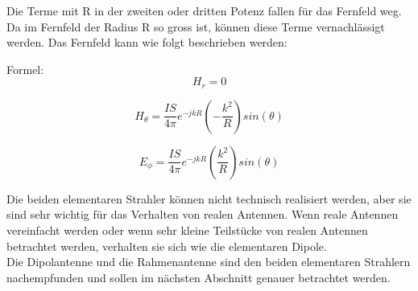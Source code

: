 Die Terme mit R in der zweiten oder dritten Potenz fallen für das Fernfeld weg. Da im Fernfeld der Radius R so gross ist, können diese  Terme vernachlässigt werden. 
Das Fernfeld kann wie folgt beschrieben werden:


Formel:
\begin{equation}
H_r= 0
\end{equation}

\begin{equation}
H_\theta= \frac{I S}{4\pi}   e^{-jkR} \left(- \frac{k^{2}}{R}   \right) sin(\theta)
\end{equation}

\begin{equation}
E_\phi= \frac{I S}{4\pi}   e^{-jkR} \left( \frac{k^{2}}{R}   \right) sin(\theta)
\end{equation}

Die beiden elementaren Strahler können nicht technisch  realisiert werden, aber sie sind sehr wichtig für das Verhalten von realen Antennen. Wenn reale Antennen vereinfacht werden oder wenn sehr kleine Teilstücke von realen Antennen betrachtet werden,  verhalten sie sich  wie die elementaren Dipole. \\

Die Dipolantenne und die Rahmenantenne sind den beiden elementaren Strahlern nachempfunden und sollen im nächsten Abschnitt genauer betrachtet werden.

